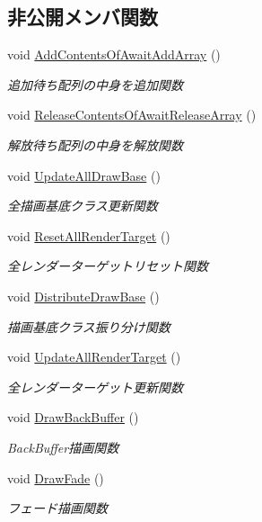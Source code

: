 \subsection*{非公開メンバ関数}
\begin{DoxyCompactItemize}
\item 
void \mbox{\hyperlink{class_draw_manager_a984cd9de288151fd1d170f80f93a11e8}{Add\+Contents\+Of\+Await\+Add\+Array}} ()
\begin{DoxyCompactList}\small\item\em 追加待ち配列の中身を追加関数 \end{DoxyCompactList}\item 
void \mbox{\hyperlink{class_draw_manager_a76361402a035f02084e9faf31e782d69}{Release\+Contents\+Of\+Await\+Release\+Array}} ()
\begin{DoxyCompactList}\small\item\em 解放待ち配列の中身を解放関数 \end{DoxyCompactList}\item 
void \mbox{\hyperlink{class_draw_manager_a7c989a2beae5de5a1fc7ab0bef8692f9}{Update\+All\+Draw\+Base}} ()
\begin{DoxyCompactList}\small\item\em 全描画基底クラス更新関数 \end{DoxyCompactList}\item 
void \mbox{\hyperlink{class_draw_manager_a20787acc9c5a096e80651dc1909ae60d}{Reset\+All\+Render\+Target}} ()
\begin{DoxyCompactList}\small\item\em 全レンダーターゲットリセット関数 \end{DoxyCompactList}\item 
void \mbox{\hyperlink{class_draw_manager_a9a09cb524187bc11f1e4812a06fe46d6}{Distribute\+Draw\+Base}} ()
\begin{DoxyCompactList}\small\item\em 描画基底クラス振り分け関数 \end{DoxyCompactList}\item 
void \mbox{\hyperlink{class_draw_manager_a8eb2f1e3957113ae99e8240c40c89744}{Update\+All\+Render\+Target}} ()
\begin{DoxyCompactList}\small\item\em 全レンダーターゲット更新関数 \end{DoxyCompactList}\item 
void \mbox{\hyperlink{class_draw_manager_ae2af73eab7153bb2e00084ed136e0780}{Draw\+Back\+Buffer}} ()
\begin{DoxyCompactList}\small\item\em Back\+Buffer描画関数 \end{DoxyCompactList}\item 
void \mbox{\hyperlink{class_draw_manager_a1585a2a0bfa05d7b1e00a51636c460af}{Draw\+Fade}} ()
\begin{DoxyCompactList}\small\item\em フェード描画関数 \end{DoxyCompactList}\end{DoxyCompactItemize}
